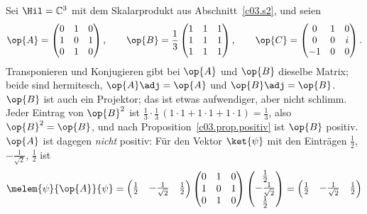 \begin{example}\label{c03.ex.drei}
  Sei $\Hil = \mathbb{C}^3$ mit dem Skalarprodukt aus Abschnitt~\ref{c03.s2}, und seien
  \begin{equation}\label{c03.eq.abc}
    \op{A} = \begin{pmatrix} 0 & 1 & 0 \\ 1 & 0 & 1 \\ 0 & 1 & 0 \end{pmatrix} ,
    \qquad
    \op{B} = \frac13 \begin{pmatrix} 1 & 1 & 1 \\ 1 & 1 & 1 \\ 1 & 1 & 1 \end{pmatrix} ,
    \qquad
    \op{C} = \begin{pmatrix} 0 & 1 & 0 \\ 0 & 0 & i \\ -1 & 0 & 0 \end{pmatrix} .
  \end{equation}
  Transponieren und Konjugieren gibt bei $\op{A}$ und $\op{B}$ dieselbe Matrix; beide sind
  hermitesch, $\op{A}\adj = \op{A}$ und $\op{B}\adj = \op{B}$. $\op{B}$ ist auch ein Projektor;
  das ist etwas aufwendiger, aber nicht schlimm. Jeder Eintrag von $\op{B}^2$ ist
  $\tfrac13 \cdot \tfrac13 \, (1 \cdot 1 + 1 \cdot 1 + 1 \cdot 1) = \tfrac13$, also
  $\op{B}^2 = \op{B}$, und nach Proposition~\ref{c03.prop.positiv} ist $\op{B}$ positiv.
  $\op{A}$ ist dagegen \emph{nicht} positiv: Für den Vektor $\ket{\psi}$ mit den Einträgen
  $\tfrac12$, $-\tfrac{1}{\sqrt{2}}$, $\tfrac12$ ist
  \begin{equation}\label{c03.eq.nicht-positiv}
    \melem{\psi}{\op{A}}{\psi}
    = \begin{pmatrix} \frac12 & -\frac{1}{\sqrt{2}} & \frac12 \end{pmatrix}
      \begin{pmatrix} 0 & 1 & 0 \\ 1 & 0 & 1 \\ 0 & 1 & 0 \end{pmatrix}
      \begin{pmatrix} \frac12 \\ -\frac{1}{\sqrt{2}} \\ \frac12 \end{pmatrix}
    = \begin{pmatrix} \frac12 & -\frac{1}{\sqrt{2}} & \frac12 \end{pmatrix}

\end{equation}
\end{example}

